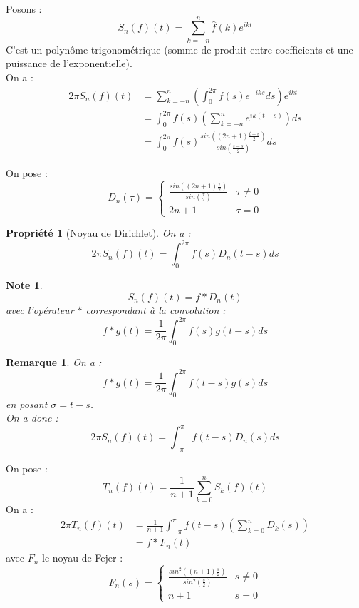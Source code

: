 \documentclass[a4paper, oneside]{report}
\theoremstyle{break}
\newtheorem{propr}[thm]{Propriété}
\newtheorem{remar}[thm]{Remarque}
\newtheorem{note}[thm]{Note}
\newcommand{\fracun}[1]{\frac{1}{#1}}
\begin{document}
Posons :
$$S_n(f)(t)= \sum_{k=-n}^{n}\widehat{f}(k)e^{ikt}$$
C'est un polynôme trigonométrique (somme de produit entre coefficients et une puissance de l'exponentielle).\\
On a :
\begin{align*}
2\pi S_n(f)(t)&=\sum_{k=-n}^{n}(\int_0^{2\pi}f(s)e^{-iks}ds)e^{ikt}\\
&=\int_0^{2\pi}f(s)(\sum_{k=-n}^{n}e^{ik(t-s)})ds\\
&= \int_0^{2\pi}f(s)\frac{sin((2n + 1)\frac{t-s}{2})}{sin(\frac{t-s}{2})}ds
\end{align*}

On pose :
$$D_n(\tau) = \left\{
\begin{array}{ll}
\frac{sin((2n + 1)\frac{\tau}{2})}{sin(\frac{\tau}{2})} & \tau \neq 0\\
2n+1 & \tau = 0
\end{array}
\right.$$

\begin{propr}[Noyau de Dirichlet]
On a :
$$2\pi S_n(f)(t)=\int_0^{2\pi}f(s)D_n(t-s)ds$$
\end{propr}

\begin{note}
$$S_n(f)(t)=f * D_n(t)$$
avec l'opérateur $*$ correspondant à la convolution :
$$f*g(t)= \fracun{2\pi}\int_0^{2\pi}f(s)g(t-s)ds$$
\end{note}

\begin{remar}
On a :
$$f*g(t)= \fracun{2\pi}\int_0^{2\pi}f(t-s)g(s)ds$$
en posant $\sigma = t-s$.\\
On a donc :
$$2\pi S_n(f)(t)=\int_{-\pi}^{\pi}f(t-s)D_n(s)ds$$
\end{remar}

On pose :
$$T_n(f)(t)=\fracun{n+1}\sum_{k=0}^nS_k(f)(t)$$
On a :
\begin{align*}
2\pi T_n(f)(t)&=\fracun{n+1}\int_{-\pi}^\pi f(t-s)(\sum_{k=0}^n D_k(s))\\
&=f*F_n(t)
\end{align*}
avec $F_n$ le noyau de Fejer :
$$F_n(s) = \left\{
\begin{array}{ll}
\frac{sin^2((n + 1)\frac{s}{2})}{sin^2(\frac{s}{2})} & s \neq 0\\
n+1 & s = 0
\end{array}
\right.$$
\end{document}
